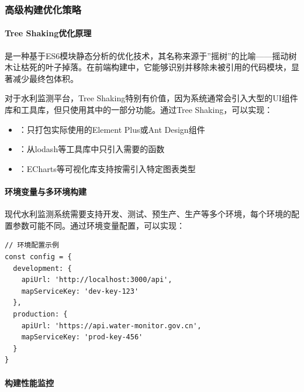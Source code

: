 \hypertarget{ux9ad8ux7ea7ux6784ux5efaux4f18ux5316ux7b56ux7565}{%
\subsubsection{高级构建优化策略}\label{ux9ad8ux7ea7ux6784ux5efaux4f18ux5316ux7b56ux7565}}

\hypertarget{tree-shakingux4f18ux5316ux539fux7406}{%
\paragraph{Tree Shaking优化原理}\label{tree-shakingux4f18ux5316ux539fux7406}}

是一种基于ES6模块静态分析的优化技术，其名称来源于''摇树''的比喻------摇动树木让枯死的叶子掉落。在前端构建中，它能够识别并移除未被引用的代码模块，显著减少最终包体积。

对于水利监测平台，Tree Shaking特别有价值，因为系统通常会引入大型的UI组件库和工具库，但只使用其中的一部分功能。通过Tree Shaking，可以实现：

\begin{itemize}
\tightlist
\item
  ：只打包实际使用的Element Plus或Ant Design组件
\item
  ：从lodash等工具库中只引入需要的函数
\item
  ：ECharts等可视化库支持按需引入特定图表类型
\end{itemize}

\hypertarget{ux73afux5883ux53d8ux91cfux4e0eux591aux73afux5883ux6784ux5efa}{%
\paragraph{环境变量与多环境构建}\label{ux73afux5883ux53d8ux91cfux4e0eux591aux73afux5883ux6784ux5efa}}

现代水利监测系统需要支持开发、测试、预生产、生产等多个环境，每个环境的配置参数可能不同。通过环境变量配置，可以实现：

\begin{lstlisting}[style=javascript]
// 环境配置示例
const config = {
  development: {
    apiUrl: 'http://localhost:3000/api',
    mapServiceKey: 'dev-key-123'
  },
  production: {
    apiUrl: 'https://api.water-monitor.gov.cn',
    mapServiceKey: 'prod-key-456'
  }
}
\end{lstlisting}

\hypertarget{ux6784ux5efaux6027ux80fdux76d1ux63a7}{%
\paragraph{构建性能监控}\label{ux6784ux5efaux6027ux80fdux76d1ux63a7}}

